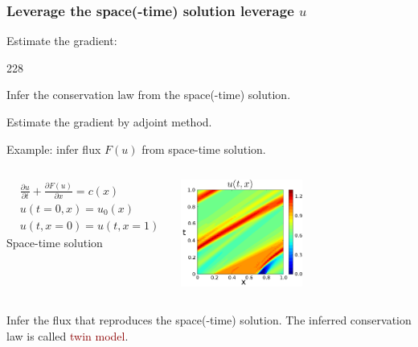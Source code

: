 \documentclass{beamer}
\newcommand{\barrow}{\item[\color{darkred}\ding{228}]}
\begin{document}
\begin{frame}
    \frametitle{Leverage the space(-time) solution \hfill \scriptsize{leverage $u$}}\small
    Estimate the gradient:
    \begin{dinglist}{228}
        \barrow Infer the conservation law from the space(-time) solution.
        \barrow Estimate the gradient by adjoint method.
    \end{dinglist}
    \vspace{.2cm}

    Example: infer flux $F(u)$ from space-time solution.
    \vspace{.1cm}
    \begin{columns}
        \begin{equation*}\begin{split}
            &\frac{\partial u}{\partial t}+ \frac{\partial {F(u)}}{\partial x} = c(x)\\
            &u(t=0,x) = u_0(x)\\
            &u(t,x=0) = u(t, x=1)
        \end{split}\end{equation*}
        \centering
        \scriptsize{
        Space-time solution}\small
        \vspace{-.1cm}
        \begin{center}
            \includegraphics[width=4cm]{imag_1.png}
        \end{center}
    \end{columns}
    \vspace{.15cm}
    Infer the flux that reproduces the space(-time) solution. The inferred
    conservation law is called \textcolor{darkred}{twin model}.
\end{frame}
\end{document}
